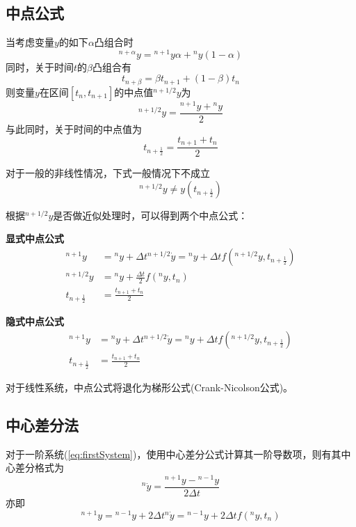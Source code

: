 \subsection{中点公式}
当考虑变量$y$的如下$\alpha$凸组合时
\begin{equation}
{^{n+\alpha}\!y}={^{n+1}\!y}\alpha+{^n\!y}(1-\alpha)
\end{equation}
同时，关于时间$t$的$\beta$凸组合有
\begin{equation}
t_{n+\beta}=\beta t_{n+1}+(1-\beta)t_n
\end{equation}
则变量$y$在区间$[t_n,t_{n+1}]$的中点值${^{n+1/2}\!y}$为
\begin{equation}
{^{n+1/2}\!y}=\frac{{^{n+1}\!y}+{^n\!y}}{2}
\end{equation}
与此同时，关于时间的中点值为
\begin{equation}
t_{n+\frac{1}{2}}=\frac{t_{n+1}+t_n}{2}
\end{equation}

对于一般的非线性情况，下式一般情况下不成立
\begin{equation}
{^{n+1/2}\!y}\neq y(t_{n+\frac{1}{2}})
\end{equation}

根据${^{n+1/2}\!y}$是否做近似处理时，可以得到两个中点公式：

\textbf{显式中点公式\cite{Gear1971a}}
\begin{align}
{^{n+1}\!y}&={^n\!y}+\Delta t{^{n+1/2}\!\dot{y}}={^n\!y}+\Delta tf({^{n+1/2}\!{y}},t_{n+\frac{1}{2}})\\
{^{n+1/2}\!{y}}&={^n\!y}+\frac{\Delta t}{2}f({^n\!y},t_n)\\
t_{n+\frac12}&=\frac{t_{n+1}+t_n}{2}
\end{align}

\textbf{隐式中点公式\cite{Hairer1993}}
\begin{align}
{^{n+1}\!y}&={^n\!y}+\Delta t{^{n+1/2}\!\dot{y}}={^n\!y}+\Delta tf({^{n+1/2}\!{y}},t_{n+\frac{1}{2}})\\
t_{n+\frac12}&=\frac{t_{n+1}+t_n}{2}
\end{align}

对于线性系统，中点公式将退化为梯形公式(Crank-Nicolson公式)。

\subsection{中心差分法}
对于一阶系统(\ref{eq:firstSystem})，使用中心差分公式计算其一阶导数项，则有其中心差分格式为
\begin{equation}
{^n\!\dot{y}}=\frac{{^{n+1}\!y}-{^{n-1}\!y}}{2\Delta t}
\end{equation}
亦即
\begin{equation}
{^{n+1}\!y}={^{n-1}\!y}+2\Delta t{^n\!\dot{y}}={^{n-1}\!y}+2\Delta tf({^n\!y},t_n)
\end{equation}

